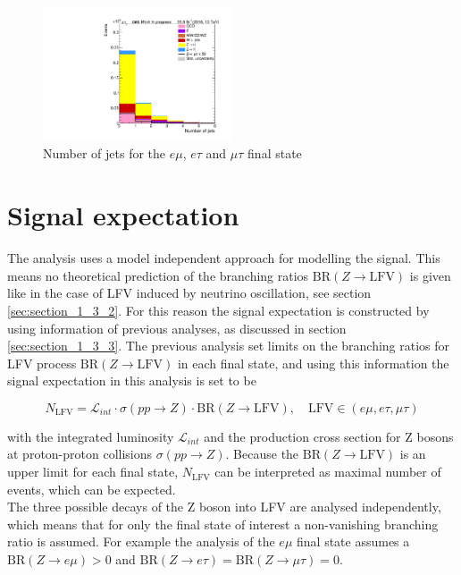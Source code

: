 \begin{figure}[htp]
	\includegraphics[width=0.5\textwidth]{plots/mt/NumberOfJets.pdf}

	\caption[Number of jets]{Number of jets for the $e\mu$, $e\tau$ and $\mu\tau$ final state}
	\label{fig:NJET}
\end{figure}



\section{Signal expectation}
\label{sec:section_3_3}

The analysis uses a model independent approach for modelling the signal. This means no theoretical prediction of the branching ratios $\text{BR}(Z\to\text{LFV})$ is given like in the case of \gls{LFV} induced by neutrino oscillation, see section \ref{sec:section_1_3_2}. For this reason the signal expectation is constructed by using information of previous analyses, as discussed in section \ref{sec:section_1_3_3}. The previous analysis set limits on the branching ratios for \gls{LFV} process $\text{BR}(Z\to\text{LFV})$ in each final state, and using this information the signal expectation in this analysis is  set to be

\begin{equation}
	\label{eq:eq_3_3}
	N_{\text{LFV}} = \mathcal{L}_{int} \cdot \sigma(pp\to Z) \cdot \text{BR}(Z\to\text{LFV}), \quad \text{LFV} \in (e\mu, e\tau, \mu\tau)
\end{equation}

with the integrated luminosity $\mathcal{L}_{int}$ and the production cross section for Z bosons at proton-proton collisions $\sigma(pp\to Z)$. Because the $\text{BR}(Z\to\text{LFV})$ is an upper limit for each final state, $N_{\text{LFV}}$ can be interpreted as maximal number of events, which can be expected. \\

The three possible decays of the Z boson into \gls{LFV} are analysed independently, which means that for only the final state of interest a non-vanishing branching ratio is assumed. For example the analysis of the $e\mu$ final state assumes a $\text{BR}(Z\to e\mu) > 0$ and  $\text{BR}(Z\to e\tau) = \text{BR}(Z\to \mu\tau) = 0$. 


